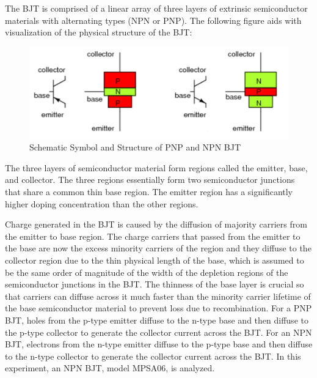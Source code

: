 The BJT is comprised of a linear array of three layers of extrinsic semiconductor materials with alternating types (NPN or PNP). The following figure aids with visualization of the physical structure of the BJT:

\FloatBarrier

\begin{figure}[h!]
	\centering
	\includegraphics[scale=0.75]{./images/bjt_fig.PNG}
	\caption{Schematic Symbol and Structure of PNP and NPN BJT}
	\label{fig:id_vs_vgs}
\end{figure}

\FloatBarrier

The three layers of semiconductor material form regions called the emitter, base, and collector. The three regions essentially form two semiconductor junctions that share a common thin base region. The emitter region has a significantly higher doping concentration than the other regions. 

Charge generated in the BJT is caused by the diffusion of majority carriers from the emitter to base region. The charge carriers that passed from the emitter to the base are now the excess minority carriers of the region and they diffuse to the collector region due to the thin physical length of the base, which is assumed to be the same order of magnitude of the width of the depletion regions of the semiconductor junctions in the BJT. The thinness of the base layer is crucial so that carriers can diffuse across it much faster than the minority carrier lifetime of the base semiconductor material to prevent loss due to recombination. For a PNP BJT, holes from the p-type emitter diffuse to the n-type base and then diffuse to the p-type collector to generate the collector current across the BJT. For an NPN BJT, electrons from the n-type emitter diffuse to the p-type base and then diffuse to the n-type collector to generate the collector current across the BJT.  In this experiment, an NPN BJT, model MPSA06, is analyzed.

